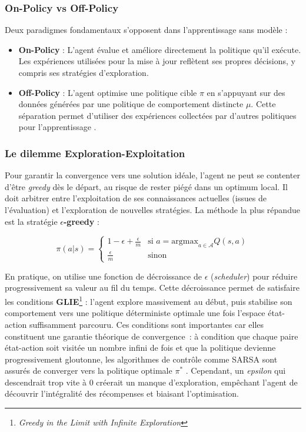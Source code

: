 \subsubsection{On-Policy vs Off-Policy}

Deux paradigmes fondamentaux s'opposent dans l'apprentissage sans modèle : 
\begin{itemize}

    \item \textbf{On-Policy} : L'agent évalue et améliore directement la politique qu'il exécute. Les expériences utilisées pour la mise à jour reflètent ses propres décisions, y compris ses stratégies d'exploration.
    \item \textbf{Off-Policy} : L'agent optimise une politique cible $\pi$ en s'appuyant sur des données générées par une politique de comportement distincte $\mu$. Cette séparation permet d'utiliser des expériences collectées par d'autres politiques pour l'apprentissage \parencite{suttonReinforcementLearningIntroduction2018}.
\end{itemize}

\subsubsection{Le dilemme Exploration-Exploitation}

Pour garantir la convergence vers une solution idéale, l'agent ne peut se contenter d'être \textit{greedy} dès le départ, au risque de rester piégé dans un optimum local. Il doit arbitrer entre l'exploitation de ses connaissances actuelles (issues de l'évaluation) et l'exploration de nouvelles stratégies. La méthode la plus répandue est la stratégie \textbf{$\epsilon$-greedy} :

\begin{equation}
\pi(a|s) = 
\begin{cases} 
1 - \epsilon + \frac{\epsilon}{m} & \text{si } a = \text{argmax}_{a \in \mathcal{A}} Q(s,a) \\
\frac{\epsilon}{m} & \text{sinon}
\end{cases}
\end{equation}

En pratique, on utilise une fonction de décroissance de $\epsilon$ (\textit{scheduler}) pour réduire progressivement sa valeur au fil du temps. Cette décroissance permet de satisfaire les conditions \textbf{GLIE}\footnote{\textit{Greedy in the Limit with Infinite Exploration}} : l'agent explore massivement au début, puis stabilise son comportement vers une politique déterministe optimale une fois l'espace état-action suffisamment parcouru. Ces conditions sont importantes car elles constituent une garantie théorique de convergence~: à condition que chaque paire état-action soit visitée un nombre infini de fois et que la politique devienne progressivement gloutonne, les algorithmes de contrôle comme SARSA sont assurés de converger vers la politique optimale $\pi^*$ \parencite{singhConvergenceResultsSingleStep2000}. Cependant, un \textit{epsilon} qui descendrait trop vite à 0 créerait un manque d'exploration, empêchant l'agent de découvrir l'intégralité des récompenses et biaisant l'optimisation.

